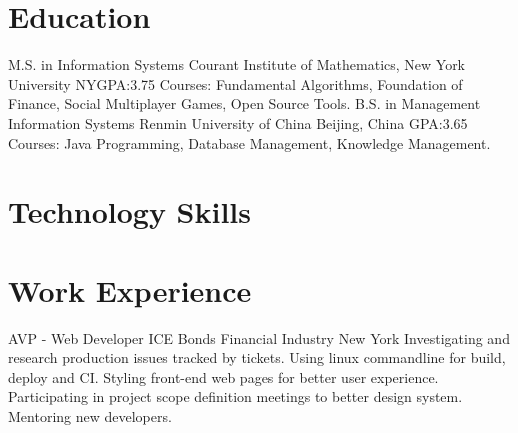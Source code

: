 \documentclass[11pt,a4paper,sans]{moderncv}   %
\begin{document}
\maketitle

\section{Education}
{M.S. in Information Systems}
{Courant Institute of Mathematics, New York University}
{NY}{GPA:3.75}
{Courses: Fundamental Algorithms, Foundation of Finance, Social Multiplayer Games, Open Source Tools.}
{B.S. in Management Information Systems}
{Renmin University of China}
{Beijing, China}
{GPA:3.65}
{Courses: Java Programming, Database Management, Knowledge Management.}

\section{Technology Skills}


\section{Work Experience}
\renewcommand{\baselinestretch}{1.25}

{AVP - Web Developer}
{ICE Bonds}
{Financial Industry}
{New York}
{
	{Investigating and research production issues tracked by tickets.}
	\newline
	{Using linux commandline for build, deploy and CI.}
	\newline
	{Styling front-end web pages for better user experience.}
	\newline
    {Participating in project scope definition meetings to better design system.}
    \newline
    {Mentoring new developers.}
}
\end{document}
